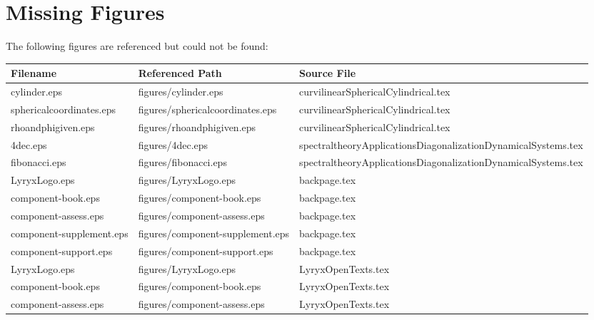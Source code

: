 \documentclass[11pt]{article}
\begin{document}
\section{Missing Figures}
The following figures are referenced but could not be found:

\begin{longtable}{|p{4cm}|p{4cm}|p{5cm}|}
\hline
\textbf{Filename} & \textbf{Referenced Path} & \textbf{Source File} \\
\hline
\endhead

cylinder.eps & figures/cylinder.eps & curvilinearSphericalCylindrical.tex \\
\hline

sphericalcoordinates.eps & figures/sphericalcoordinates.eps & curvilinearSphericalCylindrical.tex \\
\hline

rhoandphigiven.eps & figures/rhoandphigiven.eps & curvilinearSphericalCylindrical.tex \\
\hline

4dec.eps & figures/4dec.eps & spectraltheoryApplicationsDiagonalizationDynamicalSystems.tex \\
\hline

fibonacci.eps & figures/fibonacci.eps & spectraltheoryApplicationsDiagonalizationDynamicalSystems.tex \\
\hline

LyryxLogo.eps & figures/LyryxLogo.eps & backpage.tex \\
\hline

component-book.eps & figures/component-book.eps & backpage.tex \\
\hline

component-assess.eps & figures/component-assess.eps & backpage.tex \\
\hline

component-supplement.eps & figures/component-supplement.eps & backpage.tex \\
\hline

component-support.eps & figures/component-support.eps & backpage.tex \\
\hline

LyryxLogo.eps & figures/LyryxLogo.eps & LyryxOpenTexts.tex \\
\hline

component-book.eps & figures/component-book.eps & LyryxOpenTexts.tex \\
\hline

component-assess.eps & figures/component-assess.eps & LyryxOpenTexts.tex \\
\hline


\end{longtable}
\end{document}
